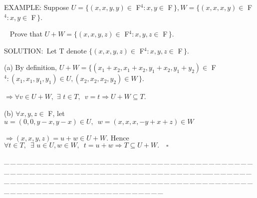 \documentclass[a4paper, 11pt, UTF8]{article}
\begin{document}
\begin{large}
{\timesbf\Large E{\small XAMPLE}}: {\timessl\Large 
Suppose $U=\{(x,x,y,y)\in$ {\timesbf F}$^4:x,y\in$ {\timesbf F}$\,\},W=\{(x,x,x,y)\in$ {\timesbf F}$^4:x,y\in$ {\timesbf F}$\,\}.$
}\par\qquad\qquad\,\,\,
{\timessl\Large Prove that $U+W=\{(x,x,y,z)\in$ {\timesbf F}$^4:x,y,z\in$ {\timesbf F}$\,\}$.}\par
{\timesbf S\footnotesize{OLUTION:}}\,\,\,Let T denote $\{(x,x,y,z)\in$ {\timesbf F}$^4:x,y,z\in$ {\timesbf F}$\,\}$.\par\quad
(a) By definition, $U+W=\{(x_1+x_2,x_1+x_2,y_1+x_2,y_1+y_2)\in$ {\timesbf F}$^4:(x_1,x_1,y_1,y_1)\in U,(x_2,x_2,x_2,y_2)\in W\,\}$.\par\qquad
$\Rightarrow\forall v\in U+W,\,\,\exists\,\,t\in T,\,\,\,v=t\Rightarrow U+W\subseteq T$.\par\quad
(b) $\forall x,y,z\in$ {\timesbf F}, let $u=(0,0,y-x,y-x)\in U,\,\,\,w=(x,x,x,-y+x+z)\in W$\par\qquad
$\Rightarrow (x,x,y,z)=u+w\in U+W$. Hence $\forall t\in T,\,\,\,\exists\,\,u\in U,w\in W,\,\,\,t=u+w\Rightarrow T\subseteq U+W.\,\,\,\,\,\,\square$\par
{\tiny \_\,\_\,\_\,\_\,\_\,\_\,\_\,\_\,\_\,\_\,\_\,\_\,\_\,\_\,\_\,\_\,\_\,\_\,\_\,\_\,\_\,\_\,\_\,\_\,\_\,\_\,\_\,\_\,\_\,\_\,\_\,\_\,\_\,\_\,\_\,\_\,\_\,\_\,\_\,\_\,\_\,\_\,\_\,\_\,\_\,\_\,\_\,\_\,\_\,\_\,\_\,\_\,\_\,\_\,\_\,\_\,\_\,\_\,\_\,\_\,\_\,\_\,\_\,\_\,\_\,\_\,\_\,\_\,\_\,\_\,\_\_\,\_\,\_\,\_\,\_\,\_\,\_\,\_\,\_\,\_\,\_\,\_\,\_\,\_\,\_\,\_\,\_\,\_\,\_\,\_\,\_\,\_\,\_\,\_\,\_\,\_\,\_\,\_\,\_\,\_\,\_\,\_\,\_\,\_\,\_\,\_\,\_\,\_\,\_\,\_\,\_\,\_\,\_\,\_\,\_\,\_\,\_\,\_\,\_\,\_\,\_\,\_\,\_\,\_\,\_\,\_\,\_\,\_\,\_\,\_\,\_\,\_\,\_\,\_\,\_\,\_\,\_\,\_\,\_\,\_\,\_}\par


\end{large}
\end{document}
